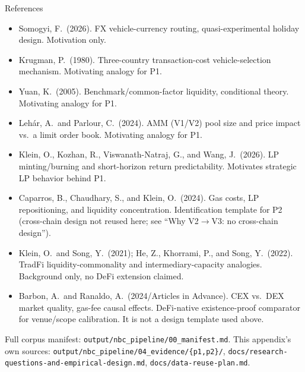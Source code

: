 \documentclass[aspectratio=169]{beamer}
\begin{document}
\begin{frame}{References}
  \scriptsize
  \begin{itemize}
    \item Somogyi, F.\ (2026). FX vehicle-currency routing, quasi-experimental holiday design. Motivation only.
    \item Krugman, P.\ (1980). Three-country transaction-cost vehicle-selection mechanism. Motivating analogy for P1.
    \item Yuan, K.\ (2005). Benchmark/common-factor liquidity, conditional theory. Motivating analogy for P1.
    \item Leh\'ar, A.\ and Parlour, C.\ (2024). AMM (V1/V2) pool size and price impact vs.\ a limit order book. Motivating analogy for P1.
    \item Klein, O., Kozhan, R., Viswanath-Natraj, G., and Wang, J.\ (2026). LP minting/burning and short-horizon return predictability. Motivates strategic LP behavior behind P1.
    \item Caparros, B., Chaudhary, S., and Klein, O.\ (2024). Gas costs, LP repositioning, and liquidity concentration. Identification template for P2 (cross-chain design not reused here; see ``Why V2$\to$V3: no cross-chain design'').
    \item Klein, O.\ and Song, Y.\ (2021); He, Z., Khorrami, P., and Song, Y.\ (2022). TradFi liquidity-commonality and intermediary-capacity analogies. Background only, no DeFi extension claimed.
    \item Barbon, A.\ and Ranaldo, A.\ (2024/Articles in Advance). CEX vs.\ DEX market quality, gas-fee causal effects. DeFi-native existence-proof comparator for venue/scope calibration. It is not a design template used above.
  \end{itemize}
  {\scriptsize Full corpus manifest: \texttt{output/nbc\_pipeline/00\_manifest.md}. This appendix's own sources: \texttt{output/nbc\_pipeline/04\_evidence/\{p1,p2\}/}, \texttt{docs/research-questions-and-empirical-design.md}, \texttt{docs/data-reuse-plan.md}.}
\end{frame}
\end{document}
